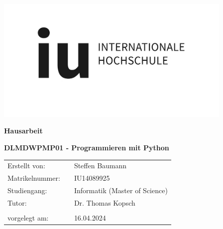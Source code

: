 \documentclass[11pt,a4paper]{scrreprt}
\begin{document}
\begin{titlepage}


\begin{center}
	
	\includegraphics[height=6cm]{LogoIU}
	
	\vspace{4cm}
	
	\LARGE{\textbf{Hausarbeit}}
	\vspace{2cm}
	
	\LARGE{\textbf{DLMDWPMP01 - Programmieren mit Python}}
\end{center}
\vspace{5cm}

\begin{flushleft}
\begin{tabular}{lcl}

Erstellt von: & & Steffen Baumann \\ 

Matrikelnummer: && IU14089925 \\ 

Studiengang: & & Informatik (Master of Science) \\ 

Tutor: & & Dr. Thomas Kopsch \\

\\



vorgelegt am: &  & 16.04.2024 \\ 

\end{tabular} 
\end{flushleft}
\end{titlepage}


\clearpage


\tableofcontents
\thispagestyle{empty}
\clearpage
\end{document}
